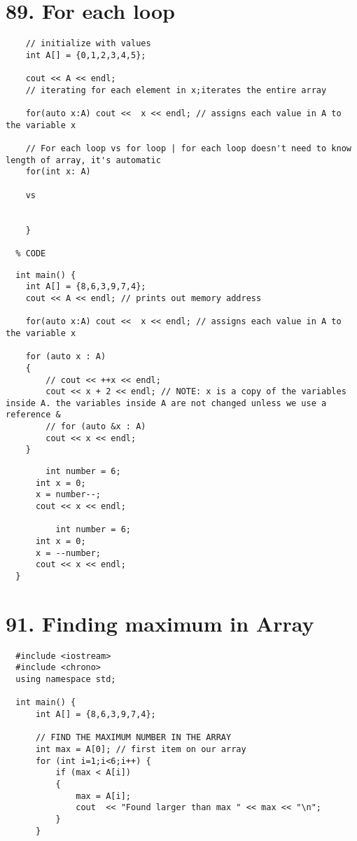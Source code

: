 \documentclass[a4paper,12pt]{book}
\begin{document}
\section{89. For each loop}
\begin{lstlisting}
    // initialize with values
    int A[] = {0,1,2,3,4,5};

    cout << A << endl;
    // iterating for each element in x;iterates the entire array

    for(auto x:A) cout <<  x << endl; // assigns each value in A to the variable x

    // For each loop vs for loop | for each loop doesn't need to know length of array, it's automatic
    for(int x: A)

    vs


    }

  % CODE
\end{lstlisting}

\begin{lstlisting}
  int main() {
    int A[] = {8,6,3,9,7,4};
    cout << A << endl; // prints out memory address

    for(auto x:A) cout <<  x << endl; // assigns each value in A to the variable x

    for (auto x : A) 
    {
        // cout << ++x << endl;
        cout << x + 2 << endl; // NOTE: x is a copy of the variables inside A. the variables inside A are not changed unless we use a reference &
        // for (auto &x : A)     
        cout << x << endl;
    }
    \end{lstlisting}
    
    
\begin{lstlisting}
        int number = 6;
      int x = 0;
      x = number--;
      cout << x << endl;

          int number = 6;
      int x = 0;
      x = --number;
      cout << x << endl;
  }
      \end{lstlisting}
  
  \section{91. Finding maximum in Array}
  \begin{lstlisting}
  #include <iostream>
  #include <chrono>
  using namespace std;
  
  int main() {
      int A[] = {8,6,3,9,7,4};
  
      // FIND THE MAXIMUM NUMBER IN THE ARRAY
      int max = A[0]; // first item on our array
      for (int i=1;i<6;i++) {
          if (max < A[i]) 
          {
              max = A[i];
              cout  << "Found larger than max " << max << "\n";
          }
      }
  \end{lstlisting}
\end{document}
